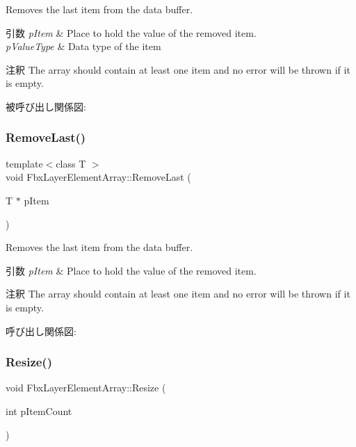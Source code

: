 Removes the last item from the data buffer. 
\begin{DoxyParams}{引数}
{\em p\+Item} & Place to hold the value of the removed item. \\
\hline
{\em p\+Value\+Type} & Data type of the item \\
\hline
\end{DoxyParams}
\begin{DoxyRemark}{注釈}
The array should contain at least one item and no error will be thrown if it is empty. 
\end{DoxyRemark}
被呼び出し関係図\+:
\mbox{\label{class_fbx_layer_element_array_a33eabc8ad1f5a95f5238a81293728717}} 
\subsubsection{\texorpdfstring{Remove\+Last()}{RemoveLast()}\hspace{0.1cm}{\footnotesize\ttfamily [2/2]}}
{\footnotesize\ttfamily template$<$class T $>$ \\
void Fbx\+Layer\+Element\+Array\+::\+Remove\+Last (\begin{DoxyParamCaption}\item[{T $\ast$}]{p\+Item }\end{DoxyParamCaption})}

Removes the last item from the data buffer. 
\begin{DoxyParams}{引数}
{\em p\+Item} & Place to hold the value of the removed item. \\
\hline
\end{DoxyParams}
\begin{DoxyRemark}{注釈}
The array should contain at least one item and no error will be thrown if it is empty. 
\end{DoxyRemark}
呼び出し関係図\+:
\mbox{\label{class_fbx_layer_element_array_a7dff6a6150f4dff69c83070a7c675db6}} 
\subsubsection{\texorpdfstring{Resize()}{Resize()}}
{\footnotesize\ttfamily void Fbx\+Layer\+Element\+Array\+::\+Resize (\begin{DoxyParamCaption}\item[{int}]{p\+Item\+Count }\end{DoxyParamCaption})}

